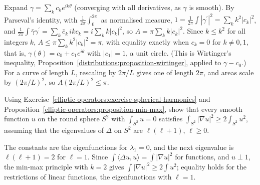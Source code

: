 \begin{solution}
Expand $\gamma = \sum_kc_ke^{ik\theta}$ (converging with all derivatives, as $\gamma$ is smooth). By Parseval's identity, with $\frac{1}{2\pi}\int_0^{2\pi}$ as normalised measure, $1 = \frac{1}{2\pi}\int|\gamma^{\prime}|^2 = \sum_kk^2|c_k|^2$, and
$\frac{1}{2\pi}\int\bar\gamma\gamma^{\prime} = \sum_k\bar c_k\,ikc_k = i\sum_kk|c_k|^2$, so $A = \pi\sum_kk|c_k|^2$. Since $k \leq k^2$ for all integers $k$, $A \leq \pi\sum_kk^2|c_k|^2 = \pi$, with equality exactly when
$c_k = 0$ for $k \neq 0, 1$, that is, $\gamma(\theta) = c_0 + c_1e^{i\theta}$ with $|c_1| = 1$, a unit circle. (This is Wirtinger's inequality, Proposition~\ref{distributions:proposition-wirtinger}, applied to
$\gamma - c_0$.) For a curve of length $L$, rescaling by $2\pi/L$ gives one of length $2\pi$, and areas scale by $(2\pi/L)^2$, so $A(2\pi/L)^2 \leq \pi$.
\end{solution}

\begin{exercise}\label{elliptic-operators:exercise-first-eigenvalue-sphere}
Using Exercise~\ref{elliptic-operators:exercise-spherical-harmonics} and Proposition~\ref{elliptic-operators:proposition-min-max}, show that every smooth function $u$ on the round sphere $S^2$ with
$\int_{S^2}u = 0$ satisfies $\int_{S^2}|\nabla u|^2 \geq 2\int_{S^2}u^2$, assuming that the eigenvalues of $\Delta$ on $S^2$ are $\ell(\ell + 1)$, $\ell \geq 0$.
\end{exercise}

\begin{solution}
The constants are the eigenfunctions for $\lambda_1 = 0$, and the next eigenvalue is $\ell(\ell + 1) = 2$ for $\ell = 1$. Since $\int\langle\Delta u, u\rangle = \int|\nabla u|^2$ for functions, and $u \perp 1$, the min-max
principle with $k = 2$ gives $\int|\nabla u|^2 \geq 2\int u^2$; equality holds for the restrictions of linear functions, the eigenfunctions with $\ell = 1$.
\end{solution}

